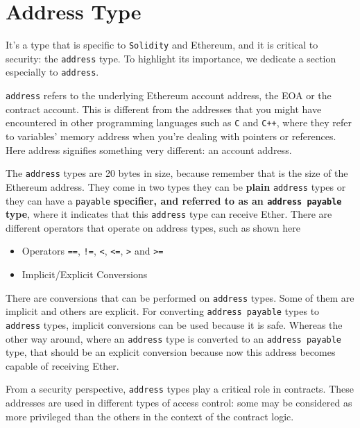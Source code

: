 \section{Address Type}\label{address-type}

It's a type that is specific to \texttt{Solidity} and Ethereum, and it
is critical to security: the \texttt{address} type. To highlight its
importance, we dedicate a section especially to \texttt{address}.

\texttt{address} refers to the underlying Ethereum account address, the
EOA or the contract account. This is different from the addresses that
you might have encountered in other programming languages such as
\texttt{C} and \texttt{C++}, where they refer to variables' memory
address when you're dealing with pointers or references. Here address
signifies something very different: an account address.

The \texttt{address} types are 20 bytes in size, because remember that
is the size of the Ethereum address. They come in two types they can be
\textbf{plain} \texttt{address} types or they can have a
\texttt{payable} \textbf{specifier, and referred to as an
\texttt{address\ payable} type}, where it indicates that this
\texttt{address} type can receive Ether. There are different operators
that operate on address types, such as shown here

\begin{itemize}
\tightlist
\item
  Operators \texttt{==}, \texttt{!=}, \texttt{\textless{}},
  \texttt{\textless{}=}, \texttt{\textgreater{}} and
  \texttt{\textgreater{}=}
\item
  Implicit/Explicit Conversions
\end{itemize}

There are conversions that can be performed on \texttt{address} types.
Some of them are implicit and others are explicit. For converting
\texttt{address\ payable} types to \texttt{address} types, implicit
conversions can be used because it is safe. Whereas the other way
around, where an \texttt{address} type is converted to an
\texttt{address\ payable} type, that should be an explicit conversion
because now this address becomes capable of receiving Ether.

From a security perspective, \texttt{address} types play a critical role
in contracts. These addresses are used in different types of access
control: some may be considered as more privileged than the others in
the context of the contract logic.

